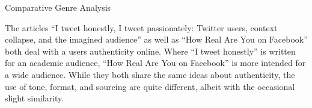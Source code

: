\documentclass[12pt]{article}
\begin{document}
    \begin{doublespace}

        \begin{center}
            \vspace*{6pt}
            Comparative Genre Analysis
        \end{center}

    \vspace{-18pt}
\par%
        The articles ``I tweet honestly, I tweet passionately: Twitter users, context collapse, and the imagined audience'' as well as ``How Real Are You on Facebook''
        both deal with a users authenticity online. Where ``I tweet honestly'' is written for an academic audience, ``How Real Are You on Facebook'' is more intended for a wide audience.
        While they both share the same ideas about authenticity, the use of tone, format, and sourcing are quite different, albeit with the occasional slight similarity. 
\par%

    \end{doublespace}
\end{document}
